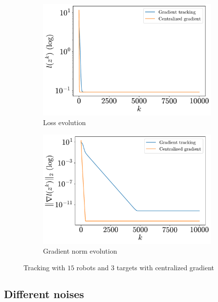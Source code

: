 \documentclass[a4paper,11pt,oneside]{book}
\begin{document}
\begin{figure}[H]
      \centering
      \begin{subfigure}[t]{0.46\linewidth}
            \centering
            \includegraphics[width=\linewidth]{./figs/tracking/centralized/loss.pdf} 
            \caption{Loss evolution}
      \end{subfigure}
      \hfill
      \begin{subfigure}[t]{0.46\linewidth}
            \centering
            \includegraphics[width=\linewidth]{./figs/tracking/centralized/gradient.pdf} 
            \caption{Gradient norm evolution}
      \end{subfigure}
      \caption{Tracking with $15$ robots and $3$ targets with centralized gradient}
      \label{fig:tracking_centralized_5_3}
\end{figure}


\subsection{Different noises}
\end{document}
